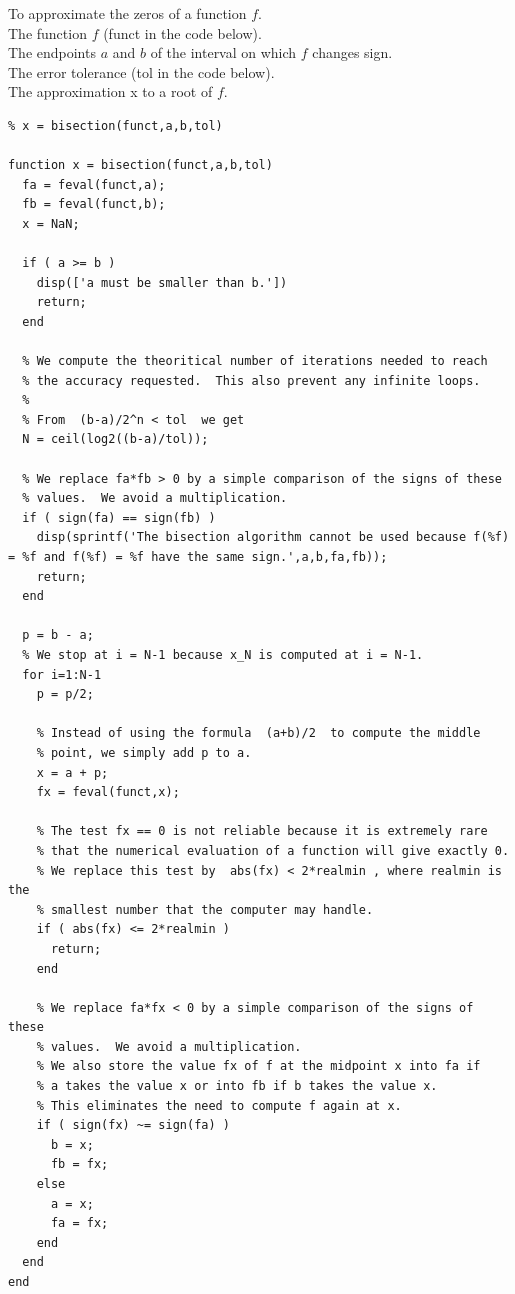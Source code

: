 \begin{code}[Bisection]
To approximate the zeros of a function $f$.\\
 The function $f$ (funct in the code below).\\
The endpoints $a$ and $b$ of the interval on which $f$ changes sign.\\
The error tolerance (tol in the code below).\\
 The approximation x to a root of $f$.
\small
\begin{verbatim}
% x = bisection(funct,a,b,tol)

function x = bisection(funct,a,b,tol)
  fa = feval(funct,a);
  fb = feval(funct,b);
  x = NaN;

  if ( a >= b )
    disp(['a must be smaller than b.'])
    return;
  end

  % We compute the theoritical number of iterations needed to reach
  % the accuracy requested.  This also prevent any infinite loops.
  %
  % From  (b-a)/2^n < tol  we get
  N = ceil(log2((b-a)/tol));

  % We replace fa*fb > 0 by a simple comparison of the signs of these
  % values.  We avoid a multiplication.
  if ( sign(fa) == sign(fb) )
    disp(sprintf('The bisection algorithm cannot be used because f(%f)
= %f and f(%f) = %f have the same sign.',a,b,fa,fb));
    return;
  end

  p = b - a;
  % We stop at i = N-1 because x_N is computed at i = N-1.
  for i=1:N-1
    p = p/2;

    % Instead of using the formula  (a+b)/2  to compute the middle
    % point, we simply add p to a.
    x = a + p;
    fx = feval(funct,x);

    % The test fx == 0 is not reliable because it is extremely rare
    % that the numerical evaluation of a function will give exactly 0.
    % We replace this test by  abs(fx) < 2*realmin , where realmin is the
    % smallest number that the computer may handle.
    if ( abs(fx) <= 2*realmin )
      return;
    end
       
    % We replace fa*fx < 0 by a simple comparison of the signs of these
    % values.  We avoid a multiplication.
    % We also store the value fx of f at the midpoint x into fa if
    % a takes the value x or into fb if b takes the value x.
    % This eliminates the need to compute f again at x.
    if ( sign(fx) ~= sign(fa) )
      b = x;
      fb = fx;
    else
      a = x;
      fa = fx;
    end
  end
end
\end{verbatim}
\end{code}


